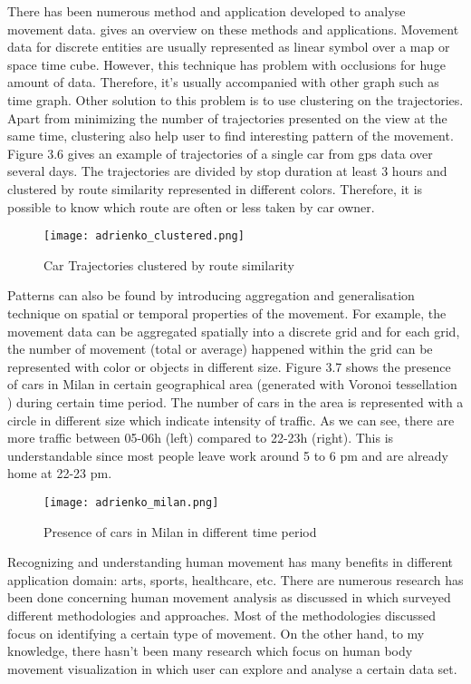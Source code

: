 There has been numerous method and application developed to analyse movement data. \cite{adrienko} gives an overview on these methods and applications. Movement data for discrete entities are usually represented as linear symbol over a map or space time cube. However, this technique has problem with occlusions for huge amount of data. Therefore, it's usually accompanied with other graph such as time graph. Other solution to this problem is to use clustering on the trajectories. Apart from minimizing the number of trajectories presented on the view at the same time, clustering also help user to find interesting pattern of the movement. Figure 3.6 \cite{adrienko_book} gives an example of trajectories of a single car from gps data over several days. The trajectories are divided by stop duration at least 3 hours and clustered by route similarity represented in different colors. Therefore, it is possible to know which route are often or less taken by car owner.

\begin{figure}
\centering
\texttt{[image: adrienko\_clustered.png]}
\caption{Car Trajectories clustered by route similarity}
\end{figure}

Patterns can also be found by introducing aggregation and generalisation technique on spatial or temporal properties of the movement. For example, the movement data can be aggregated spatially into a discrete grid and for each grid, the number of movement (total or average) happened within the grid can be represented with color or objects in different size. Figure 3.7 \cite{adrienko_book} shows the presence of cars in Milan in certain geographical area (generated with Voronoi tessellation \cite{okabe}) during certain time period. The number of cars in the area is represented with a circle in different size which indicate intensity of traffic. As we can see, there are more traffic between 05-06h (left) compared to 22-23h (right). This is understandable since most people leave work around 5  to 6 pm and are already home at 22-23 pm.

\begin{figure}
\centering
\texttt{[image: adrienko\_milan.png]}
\caption{Presence of cars in Milan in different time period}
\end{figure}

Recognizing and understanding human movement has many benefits in different application domain: arts\cite{heryadi,raptis}, sports\cite{bernard2013}, healthcare\cite{patsadu}, etc. There are numerous research has been done concerning human movement analysis as discussed in  \cite{gavrila} which surveyed different methodologies and approaches. Most of the methodologies discussed focus on identifying a certain type of movement. On the other hand, to my knowledge, there hasn't been many research which focus on human body movement visualization in which user can explore and analyse a certain data set. 

